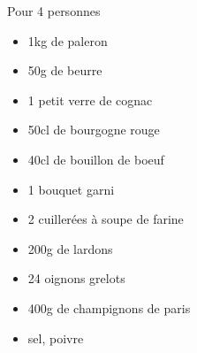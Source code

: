 \bigskip
{}
{Pour 4 personnes}{\begin{itemize}
	\item 1kg de paleron 
	\item 50g de beurre 
	\item 1 petit verre de cognac
	\item 50cl de bourgogne rouge
	\item 40cl de bouillon de boeuf
	\item 1 bouquet garni
	\item 2 cuillerées à soupe de farine
	\item 200g de lardons
	\item 24 oignons grelots
	\item 400g de champignons de paris 
	\item sel, poivre
\end{itemize}}
